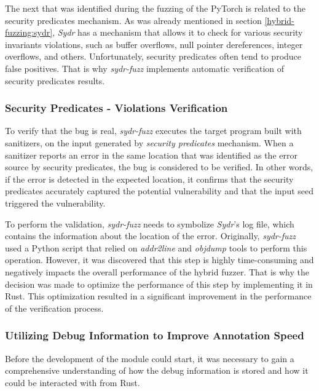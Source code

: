 The next that was identified during the fuzzing of the PyTorch is related to the security predicates mechanism. As was already mentioned in section \ref{hybrid-fuzzing:sydr}, \textit{Sydr} has a mechanism that allows it to check for various security invariants violations, such as buffer overflows, null pointer dereferences, integer overflows, and others. Unfortunately, security predicates often tend to produce false positives. That is why \textit{sydr-fuzz} implements automatic verification of security predicates results.

\subsubsection{Security Predicates - Violations Verification}

To verify that the bug is real, \textit{sydr-fuzz} executes the target program built with sanitizers, on the input generated by \textit{security predicates} mechanism. When a sanitizer reports an error in the same location that was identified as the error source by security predicates, the bug is considered to be verified. In other words, if the error is detected in the expected location, it confirms that the security predicates accurately captured the potential vulnerability and that the input seed triggered the vulnerability.

To perform the validation, \textit{sydr-fuzz} needs to symbolize \textit{Sydr}'s log file, which contains the information about the location of the error. Originally, \textit{sydr-fuzz} used a Python script that relied on \textit{addr2line} and \textit{objdump} tools to perform this operation. However, it was discovered that this step is highly time-consuming and negatively impacts the overall performance of the hybrid fuzzer. That is why the decision was made to optimize the performance of this step by implementing it in Rust. This optimization resulted in a significant improvement in the performance of the verification process.

\subsubsection{Utilizing Debug Information to Improve Annotation Speed}

Before the development of the module could start, it was necessary to gain a comprehensive understanding of how the debug information is stored and how it could be interacted with from Rust.


